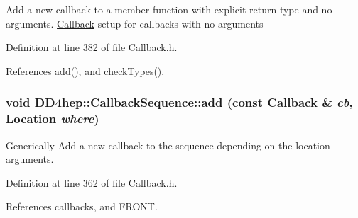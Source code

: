 Add a new callback to a member function with explicit return type and no arguments. \hyperlink{class_d_d4hep_1_1_callback}{Callback} setup for callbacks with no arguments 

Definition at line 382 of file Callback.h.

References add(), and checkTypes().\hypertarget{struct_d_d4hep_1_1_callback_sequence_a5941696a51eacc65b1c9221e03e4077d}{
\subsubsection[{add}]{\setlength{\rightskip}{0pt plus 5cm}void DD4hep::CallbackSequence::add (const {\bf Callback} \& {\em cb}, \/  {\bf Location} {\em where})}}
\label{struct_d_d4hep_1_1_callback_sequence_a5941696a51eacc65b1c9221e03e4077d}


Generically Add a new callback to the sequence depending on the location arguments. 

Definition at line 362 of file Callback.h.

References callbacks, and FRONT.

